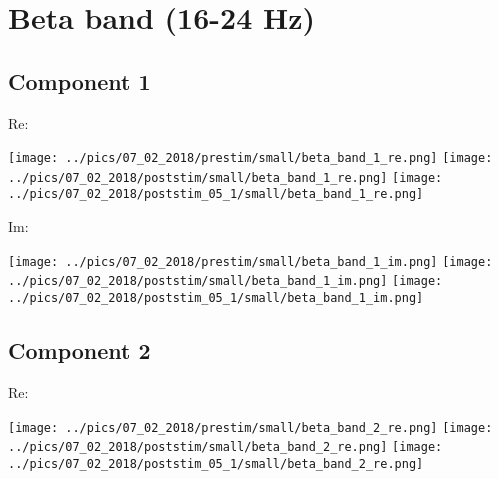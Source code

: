 \documentclass{article}
\begin{document}

\section{Beta band (16-24 Hz)}

\subsection*{Component 1}
Re:

\hspace{0.5cm}
\texttt{[image: ../pics/07\_02\_2018/prestim/small/beta\_band\_1\_re.png]}
\hspace{0.5cm}
\texttt{[image: ../pics/07\_02\_2018/poststim/small/beta\_band\_1\_re.png]}
\hspace{0.5cm}
\texttt{[image: ../pics/07\_02\_2018/poststim\_05\_1/small/beta\_band\_1\_re.png]}

Im:

\hspace{0.5cm}
\texttt{[image: ../pics/07\_02\_2018/prestim/small/beta\_band\_1\_im.png]}
\hspace{0.5cm}
\texttt{[image: ../pics/07\_02\_2018/poststim/small/beta\_band\_1\_im.png]}
\hspace{0.5cm}
\texttt{[image: ../pics/07\_02\_2018/poststim\_05\_1/small/beta\_band\_1\_im.png]}

\subsection*{Component 2}
Re:

\hspace{0.5cm}
\texttt{[image: ../pics/07\_02\_2018/prestim/small/beta\_band\_2\_re.png]}
\hspace{0.5cm}
\texttt{[image: ../pics/07\_02\_2018/poststim/small/beta\_band\_2\_re.png]}
\hspace{0.5cm}
\texttt{[image: ../pics/07\_02\_2018/poststim\_05\_1/small/beta\_band\_2\_re.png]}
\end{document}
